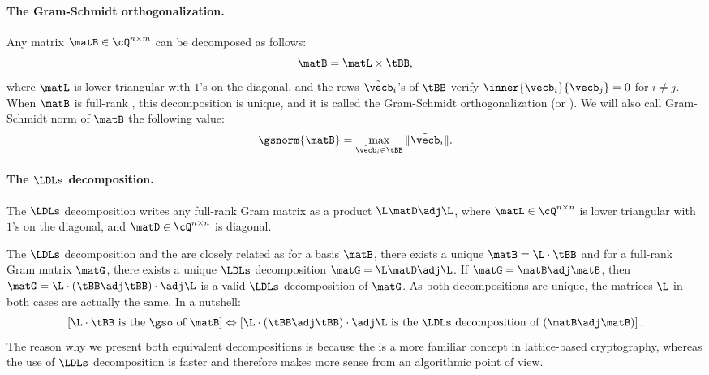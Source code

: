 
\paragraph{The Gram-Schmidt orthogonalization.}
Any matrix $\matB \in \cQ^{n \times m}$ can be decomposed as follows:
\begin{equation}
 \matB = \matL \times \tBB,
\end{equation}
where $\matL$ is lower triangular with $1$'s on the diagonal, and the rows $\tilde \vecb_i$'s of $\tBB$ verify $\inner{\vecb_i}{ \vecb_j} = 0$ for $i \neq j$. When $\matB$ is full-rank , this decomposition is unique, and it is called the Gram-Schmidt orthogonalization (or \gso).
We will also call Gram-Schmidt norm of $\matB$ the following value:
\begin{equation}
 \gsnorm{\matB} = \max_{\tilde\vecb_i \in \tBB} \|\tilde\vecb_i\|.
\end{equation}

\paragraph{The $\LDLs$ decomposition.} The $\LDLs$ decomposition writes any full-rank Gram matrix as a product $\L \matD \adj\L$, where $\matL \in \cQ^{n\times n}$ is lower triangular with $1$'s on the diagonal, and $\matD \in \cQ^{n\times n}$ is diagonal.

The $\LDLs$ decomposition and the \gso are closely related as for a basis $\matB$, there exists a unique \gso $\matB = \L \cdot \tBB$ and for a full-rank Gram matrix $\matG$, there exists a unique $\LDLs$ decomposition $\matG = \L  \matD  \adj\L$. If $\matG = \matB \adj \matB$, then $\matG = \L \cdot (\tBB \adj \tBB) \cdot \adj\L$ is a valid $\LDLs$ decomposition of $\matG$. As both decompositions are unique, the matrices $\L$ in both cases are actually the same. In a nutshell:
\begin{equation}
 \left[\L\cdot\tBB \text{ is the \gso of } \matB \right]
  \Leftrightarrow  \left[ \L \cdot (\tBB\adj \tBB) \cdot \adj\L  \text{ is the $\LDLs$ decomposition of }(\matB\adj \matB)\right].
\end{equation}
The reason why we present both equivalent decompositions is because the \gso is a more familiar concept in lattice-based cryptography, whereas the use of $\LDLs$ decomposition is faster and therefore makes more sense from an algorithmic point of view.